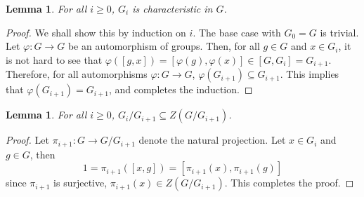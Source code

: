 \documentclass[12pt]{article}
\theoremstyle{thmstyle}
\newtheorem{lemma}[theorem]{Lemma}
\theoremstyle{defstyle}
\renewcommand{\ge}{\geqslant}
\begin{document}
\begin{lemma}
    For all $i\ge 0$, $G_i$ is characteristic in $G$.
\end{lemma}
\begin{proof}
    We shall show this by induction on $i$. The base case with $G_0 = G$ is trivial. Let $\varphi:G\to G$ be an automorphism of groups. Then, for all $g\in G$ and $x\in G_i$, it is not hard to see that $\varphi([g,x]) = [\varphi(g),\varphi(x)]\in [G,G_i] = G_{i + 1}$. Therefore, for all automorphisms $\varphi: G\to G$, $\varphi(G_{i + 1})\subseteq G_{i + 1}$. This implies that $\varphi(G_{i + 1}) = G_{i + 1}$, and completes the induction.
\end{proof}

\begin{lemma}
    For all $i\ge 0$, $G_i/G_{i + 1} \subseteq Z(G/G_{i + 1})$.
\end{lemma}
\begin{proof}
    Let $\pi_{i + 1}: G\to G/G_{i + 1}$ denote the natural projection. Let $x\in G_i$ and $g\in G$, then 
    \begin{equation*}
        1 = \pi_{i + 1}([x, g]) = [\pi_{i + 1}(x), \pi_{i + 1}(g)]
    \end{equation*}
    since $\pi_{i + 1}$ is surjective, $\pi_{i + 1}(x)\in Z(G/G_{i + 1})$. This completes the proof.
\end{proof}
\end{document}
